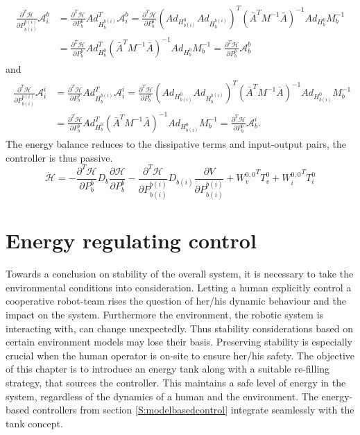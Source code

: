 \documentclass[a4paper,twoside, openright,12pt]{report}
\begin{document}
{\begin{eqnarray}
\begin{aligned}
\frac{\partial^T \mathcal{H}}{\partial P_{b(i)}^{b(i)}} \mathcal{A}_i^b &= \frac{\partial^T \mathcal{H}}{\partial P_b^b}Ad_{H_b^{b(i)}}^T\mathcal{A}_i^b = \frac{\partial^T \mathcal{H}}{\partial P_b^b} (Ad_{H_{b(i)}^0}Ad_{H_b^{b(i)}})^T (\bar{A}^TM^{-1}\bar{A})^{-1} Ad_{H_b^0}M_b^{-1}
 \\ 
&= \frac{\partial^T \mathcal{H}}{\partial P_b^b} Ad_{H_b^0}^T (\bar{A}^TM^{-1}\bar{A})^{-1} Ad_{H_b^0}M_b^{-1} = \frac{\partial^T \mathcal{H}}{\partial P_b^b} \mathcal{A}_b^b
\end{aligned}
\end{eqnarray}
and
\begin{eqnarray}
\begin{aligned}
\frac{\partial^T \mathcal{H}}{\partial P_{b(i)}^{b(i)}} \mathcal{A}_i^i &= \frac{\partial^T \mathcal{H}}{\partial P_b^b}Ad_{H_b^{b(i)}}^T\mathcal{A}_i^i = \frac{\partial^T \mathcal{H}}{\partial P_b^b} (Ad_{H_{b(i)}^0}Ad_{H_b^{b(i)}})^T (\bar{A}^TM^{-1}\bar{A})^{-1} Ad_{H_{b(i)}^0}M_b^{-1}  \\ 
&= \frac{\partial^T \mathcal{H}}{\partial P_b^b} Ad_{H_b^0}^T (\bar{A}^TM^{-1}\bar{A})^{-1} Ad_{H_{b(i)}^0}M_b^{-1} = \frac{\partial^T \mathcal{H}}{\partial P_b^b} \mathcal{A}_b^i.
\end{aligned}
\end{eqnarray}
The energy balance reduces to the dissipative terms and input-output pairs, the controller is thus passive.
\begin{equation}
\dot{\mathcal{H}} = -\frac{\partial^T \mathcal{H}}{\partial P_b^b} D_b \frac{\partial \mathcal{H}}{\partial P_b^b} - \frac{\partial^T \mathcal{H}}{\partial P_{b(i)}^{b(i)}} D_{b(i)} \frac{\partial V}{\partial P_{b(i)}^{b(i)}} + {W_v^{0,0}}^T T_v^0 + {W_i^{0,0}}^T T_i^0
\end{equation}
 


\chapter{Energy regulating control}\label{C:Energy-aware control}
Towards a conclusion on stability of the overall system, it is necessary to take the environmental conditions into consideration. Letting a human explicitly control a cooperative robot-team rises the question of her/his dynamic behaviour and the impact on the system. Furthermore the environment, the robotic system is interacting with, can change unexpectedly. Thus stability considerations based on certain environment models may lose their basis. Preserving stability is especially crucial when the human operator is on-site to ensure her/his safety. The objective of this chapter is to introduce an energy tank along with a suitable re-filling strategy, that sources the controller. This maintains a safe level of energy in the system, regardless of the dynamics of a human and the environment. The energy-based controllers from section \ref{S:modelbasedcontrol} integrate seamlessly with the tank concept.
}
\end{document}
